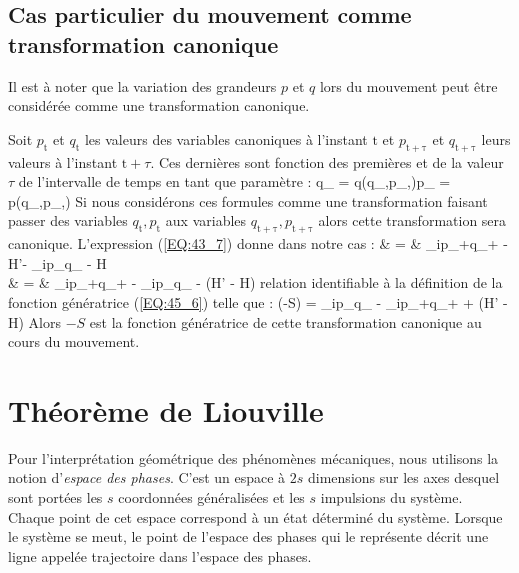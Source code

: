 \subsection{Cas particulier du mouvement comme transformation canonique}\label{PAR:45_3}

Il est \`{a} noter que la variation des grandeurs $p$ et $q$ lors du mouvement peut \^{e}tre consid\'{e}r\'{e}e comme une transformation canonique.

Soit $p_{\mathrm{t}}$ et $q_{\mathrm{t}}$ les valeurs des variables canoniques \`{a} l'instant $\mathrm{t}$ et $p_{\mathrm{t+\tau}}$ et $q_{\mathrm{t+\tau}}$ leurs valeurs \`{a} l'instant $\mathrm{t} + \tau$. Ces derni\`{e}res sont fonction des premi\`{e}res et de la valeur $\tau$ de l'intervalle de temps en tant que param\`{e}tre :
\benn
	q_{} = q(q_{},p_{},\tau)p_{} = p(q_{},p_{},\tau)
\eenn
Si nous consid\'{e}rons ces formules comme une transformation faisant passer des variables $q_{\mathrm{t}},p_{\mathrm{t}}$ aux variables $q_{\mathrm{t+\tau}},p_{\mathrm{t+\tau}}$ alors cette transformation sera canonique. L'expression (\ref{EQ:43_7}) donne dans notre cas :
\bea
	 & = & \sum_{i}p_{+\tau}q_{+\tau} - H'\tau - \sum_{i}p_{}q_{} - H\tau \nonumber \\
	& = & \sum_{i}p_{+\tau}q_{+\tau} - \sum_{i}p_{}q_{} - (H' - H)\tau \nonumber
\eea
relation identifiable \`{a} la d\'{e}finition de la fonction g\'{e}n\'{e}ratrice (\ref{EQ:45_6}) telle que :
\benn
	(-S) = \sum_{i}p_{}q_{} - \sum_{i}p_{+\tau}q_{+\tau} + (H' - H)\tau
\eenn
Alors $-S$ est la fonction g\'{e}n\'{e}ratrice de cette transformation canonique au cours du mouvement.

\section{Th\'{e}or\`{e}me de Liouville}\label{PAR:46}

Pour l'interpr\'{e}tation g\'{e}om\'{e}trique des ph\'{e}nom\`{e}nes m\'{e}caniques, nous utilisons la notion d'\emph{espace des phases}. C'est un espace \`{a} $2s$ dimensions sur les axes desquel sont port\'{e}es les $s$ coordonn\'{e}es g\'{e}n\'{e}ralis\'{e}es et les $s$ impulsions du syst\`{e}me. Chaque point de cet espace correspond \`{a} un \'{e}tat d\'{e}termin\'{e} du syst\`{e}me. Lorsque le syst\`{e}me se meut, le point de l'espace des phases qui le repr\'{e}sente d\'{e}crit une ligne appel\'{e}e trajectoire dans l'espace des phases.

